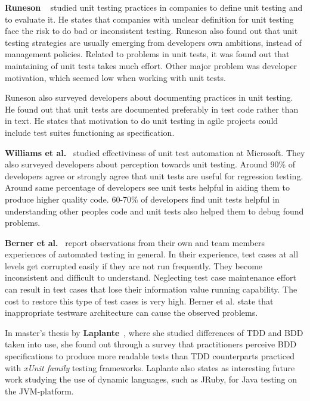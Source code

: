     \textbf{Runeson} ~\cite{runeson2006survey} studied unit testing practices in companies to define unit testing and to evaluate it.
    He states that companies with unclear definition for unit testing face the risk to do bad or inconsistent
    testing. Runeson also found out that unit testing strategies are usually emerging from developers own ambitions, instead of
    management policies.
    Related to problems in unit tests, it was found out that maintaining of unit tests takes much effort. Other
    major problem was developer motivation, which seemed low when working with unit tests.

    Runeson also surveyed developers about documenting practices in unit testing. He found out that unit tests
    are documented preferably in test code rather than in text. He states that motivation to do unit testing in agile projects
    could include test suites functioning as specification.

    \textbf{Williams et al.}~\cite{williams2009effectiveness} studied effectiviness of unit test automation at Microsoft. They also
    surveyed developers about perception towards unit testing.  Around 90\% of developers agree or strongly agree that unit
    tests are useful for regression testing. Around same percentage of developers see unit tests helpful in aiding them to
    produce higher quality code. 60-70\% of developers find unit tests helpful in understanding other peoples code and
    unit tests also helped them to debug found problems.

    \textbf{Berner et al.}~\cite{berner2005observations} report observations from their own and team members experiences of
    automated testing in general. In their experience, test cases at all levels get corrupted easily if they are not
    run frequently. They become inconsistent and difficult to understand. Neglecting test case maintenance effort can result
    in test cases that lose their information value running capability. The cost to restore this type of test cases is very high.
    Berner et al. state that inappropriate testware architecture can cause the observed problems.

    In master's thesis by \textbf{Laplante}~\cite{laplante2009behavior}, where she studied differences of TDD and BDD taken into use,
    she found out through a survey that practitioners perceive BDD
    specifications to produce more readable tests than TDD counterparts practiced with \textit{xUnit family} testing frameworks. Laplante
    also states as interesting future work studying the use of dynamic languages, such as JRuby, for Java testing on the JVM-platform.

